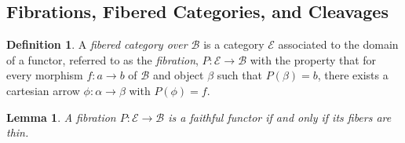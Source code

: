 \documentclass[10pt]{article}
\newtheorem{lemma}[theorem]{Lemma}
\theoremstyle{definition}
\newtheorem{definition}{Definition}[section]
\theoremstyle{remark}
\newcommand{\catB}{\mathcal{B}}
\newcommand{\catE}{\mathcal{E}}
\begin{document}
\subsection{Fibrations, Fibered Categories, and Cleavages}
\begin{definition}
    A \textit{fibered category over $\catB$} is a category $\catE$ associated to the domain of a functor, referred to as the \textit{fibration}, $P : \catE \to \catB$ with the property that for every morphism $f : a \to b$ of $\catB$ and object $\beta$ such that $P(\beta) = b$, there exists a cartesian arrow $\phi : \alpha \to \beta$ with $P(\phi) = f$.
\end{definition}
\begin{lemma}
    A fibration $P : \catE \to \catB$ is a faithful functor if and only if its fibers are thin.
\end{lemma}
\end{document}
